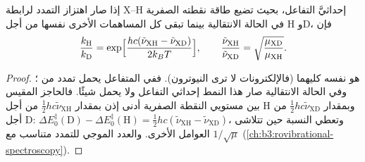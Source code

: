 \begin{proposition}\label{prop:b3:rate-theories:primary-kie}
إذا صار اهتزاز التمدد لرابطة X--H إحداثيَّ التفاعل،
بحيث تضيع طاقة نقطته الصفرية في الحالة الانتقالية بينما تبقى كل المساهمات
الأخرى نفسها من أجل H وD، فإن
\[
  \frac{k_{\mathrm H}}{k_{\mathrm D}} = \exp\Bigl[\frac{hc(\tilde\nu_{\mathrm{XH}} - \tilde\nu_{\mathrm{XD}})}{2k_BT}\Bigr],
  \qquad \frac{\tilde\nu_{\mathrm{XH}}}{\tilde\nu_{\mathrm{XD}}} = \sqrt{\frac{\mu_{\mathrm{XD}}}{\mu_{\mathrm{XH}}}} .
\]
\end{proposition}

\begin{proof}
 هو نفسه  كليهما (فالإلكترونات
لا ترى النيوترون). ففي المتفاعل يحمل تمدد  من ؛ وفي الحالة الانتقالية صار هذا النمط
إحداثي التفاعل ولا يحمل شيئًا. فالحاجز المقيس بين مستويي النقطة
الصفرية أدنى إذن بمقدار $\frac12hc\tilde\nu_{\mathrm{XH}}$ من أجل H وبمقدار $\frac12hc\tilde\nu_{\mathrm{XD}}$ من أجل D: $\Delta E_0^{\ddagger}(\mathrm D) -
\Delta E_0^{\ddagger}(\mathrm H) = \frac12hc(\tilde\nu_{\mathrm{XH}} - \tilde\nu_{\mathrm{XD}})$، وتعطي  النسبة حين
تتلاشى العوامل الأخرى. والعدد الموجي للتمدد متناسب مع
$1/\sqrt\mu$ (\cref{ch:b3:rovibrational-spectroscopy}).
\end{proof}

